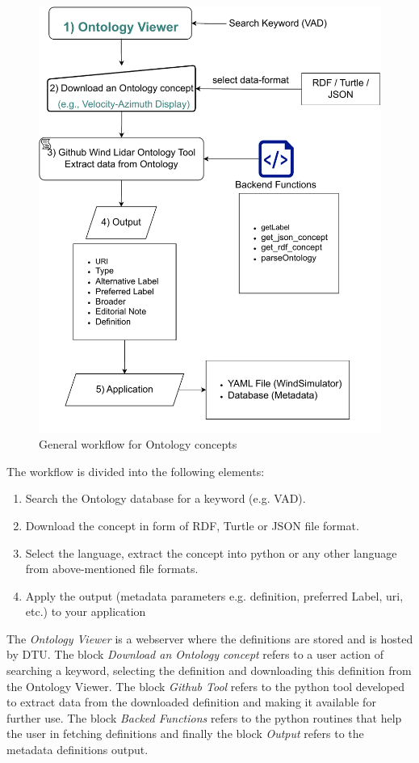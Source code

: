 \documentclass[remotesensing,article,submit,pdftex,moreauthors]{Definitions/mdpi}
\begin{document}
\begin{figure}[h!]
    \centering
    \includegraphics[width=\textwidth]{Figures/Ontology_flow.drawio.pdf}
    \caption{General workflow for Ontology concepts}
    \label{Ontology_workflow}
\end{figure}

The workflow is divided into the following elements:

\begin{enumerate}
    \item Search the Ontology database for a keyword (e.g. VAD).
    \item Download the concept in form of RDF, Turtle or JSON file format.
    \item Select the language, extract the concept into python or any other language from above-mentioned file formats.
    \item Apply the output (metadata parameters e.g. definition, preferred Label, uri, etc.) to your application
\end{enumerate}

The \textit{Ontology Viewer} is a webserver where the definitions are stored and is hosted by DTU. The block \textit{Download an Ontology concept} refers to a user action of searching a keyword, selecting the definition and downloading this definition from the Ontology Viewer. The block \textit{Github Tool} refers to the python tool developed to extract data from the downloaded definition and making it available for further use. The block \textit{Backed Functions} refers to the python routines that help the user in fetching definitions and finally the block \textit{Output} refers to the metadata definitions output.
\end{document}
